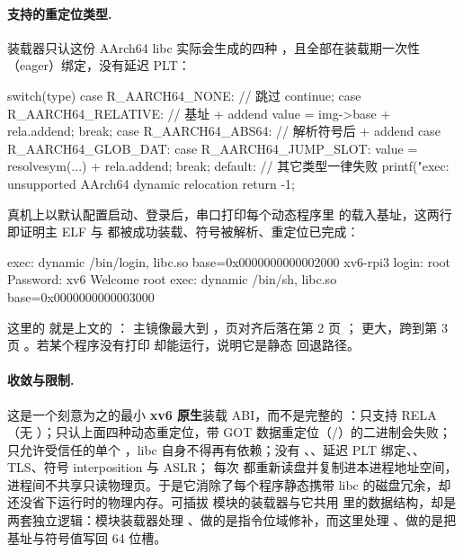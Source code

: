 \paragraph{支持的重定位类型.} 装载器只认这份 AArch64 libc 实际会生成的四种 ，且全部在装载期一次性（eager）绑定，没有延迟 PLT：

\begin{ccode}
switch(type){
case R_AARCH64_NONE:                       // 跳过
  continue;
case R_AARCH64_RELATIVE:                   // 基址 + addend
  value = img->base + rela.addend; break;
case R_AARCH64_ABS64:                      // 解析符号后 + addend
case R_AARCH64_GLOB_DAT:
case R_AARCH64_JUMP_SLOT:
  value = resolvesym(...) + rela.addend; break;
default:                                   // 其它类型一律失败
  printf("exec: unsupported AArch64 dynamic relocation %
  return -1;
}
\end{ccode}

真机上以默认配置启动、登录后，串口打印每个动态程序里  的载入基址，这两行即证明主 ELF 与  都被成功装载、符号被解析、重定位已完成：

\begin{txtcode}
exec: dynamic /bin/login, libc.so base=0x0000000000002000
xv6-rpi3 login: root
Password: xv6
Welcome root
exec: dynamic /bin/sh, libc.so base=0x0000000000003000
\end{txtcode}

这里的  就是上文的 ： 主镜像最大到 ，页对齐后落在第 2 页 ； 更大，跨到第 3 页 。若某个程序没有打印  却能运行，说明它是静态  回退路径。

\paragraph{收敛与限制.} 这是一个刻意为之的最小 \textbf{xv6 原生}装载 ABI，而不是完整的 ：只支持 RELA（无 ）；只认上面四种动态重定位，带 GOT 数据重定位（/）的二进制会失败；只允许受信任的单个 ，libc 自身不得再有依赖；没有 、、延迟 PLT 绑定、、TLS、符号 interposition 与 ASLR； 每次  都重新读盘并复制进本进程地址空间，进程间不共享只读物理页。于是它消除了每个程序静态携带 libc 的磁盘冗余，却还没省下运行时的物理内存。可插拔  模块的装载器与它共用  里的数据结构，却是两套独立逻辑：模块装载器处理 、做的是指令位域修补，而这里处理 、做的是把基址与符号值写回 64 位槽。

